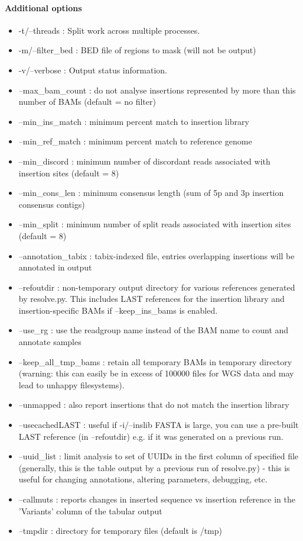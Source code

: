 \documentclass[letterpaper,11pt]{article}
\begin{document}
\paragraph{Additional options}
\begin{itemize}
\item -t/--threads : Split work across multiple processes.
\item -m/--filter\_bed : BED file of regions to mask (will not be output)
\item -v/--verbose : Output status information.
\item --max\_bam\_count : do not analyse insertions represented by more than this number of BAMs (default = no filter)
\item --min\_ins\_match : minimum percent match to insertion library
\item --min\_ref\_match : minimum percent match to reference genome
\item --min\_discord : minimum number of discordant reads associated with insertion sites (default = 8)
\item --min\_cons\_len : minimum consensus length (sum of 5p and 3p insertion consensus contigs)
\item --min\_split : minimum number of split reads associated with insertion sites (default = 8)
\item --annotation\_tabix : tabix-indexed file, entries overlapping insertions will be annotated in output
\item --refoutdir : non-temporary output directory for various references generated by resolve.py. This includes LAST references for the insertion library and insertion-specific BAMs if --keep\_ins\_bams is enabled.
\item --use\_rg : use the readgroup name instead of the BAM name to count and annotate samples
\item --keep\_all\_tmp\_bams : retain all temporary BAMs in temporary directory (warning: this can easily be in excess of 100000 files for WGS data and may lead to unhappy filesystems).
\item --unmapped : also report insertions that do not match the insertion library
\item --usecachedLAST : useful if -i/--inslib FASTA is large, you can use a pre-built LAST reference (in --refoutdir) e.g. if it was generated on a previous run.
\item --uuid\_list : limit analysis to set of UUIDs in the first column of specified file (generally, this is the table output by a previous run of resolve.py) - this is useful for changing annotations, altering parameters, debugging, etc.
\item --callmuts : reports changes in inserted sequence vs insertion reference in the 'Variants' column of the tabular output
\item --tmpdir : directory for temporary files (default is /tmp)
\end{itemize}
\end{document}
